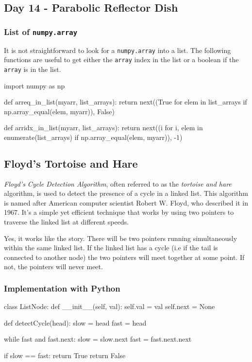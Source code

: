 \documentclass[]{scrartcl}
\begin{document}
\subsection{Day 14 - Parabolic Reflector Dish}

\subsubsection{List of \texttt{numpy.array}}

It is not straightforward to look for a \verb|numpy.array| into a list. The following functions are useful to get either the \verb|array| index in the list or a boolean if the \verb|array| is in the list.

\begin{ipython}
import numpy as np

def arreq_in_list(myarr, list_arrays):
    return next((True for elem in list_arrays 
                 if np.array_equal(elem, myarr)), False)

def arridx_in_list(myarr, list_arrays):
    return next((i for i, elem in enumerate(list_arrays) 
                 if np.array_equal(elem, myarr)), -1)
\end{ipython}

\subsection{Floyd's Tortoise and Hare}

\emph{Floyd's Cycle Detection Algorithm}, often referred to as the \emph{tortoise and hare} algorithm, is used to detect the presence of a cycle in a linked list. This algorithm is named after American computer scientist Robert W. Floyd, who described it in 1967. It's a simple yet efficient technique that works by using two pointers to traverse the linked list at different speeds.

Yes, it works like the story. There will be two pointers running simultaneously within the same linked list. If the linked list has a cycle (i.e if the tail is connected to another node) the two pointers will meet together at some point. If not, the pointers will never meet.

\subsubsection {Implementation with Python}
\begin{ipython}
class ListNode:
    def __init__(self, val):
        self.val = val
        self.next = None

    def detectCycle(head):
        slow = head
        fast = head

        while fast and fast.next:
            slow = slow.next
            fast = fast.next.next

            if slow == fast:
                return True  
		return False
\end{ipython}
\end{document}
